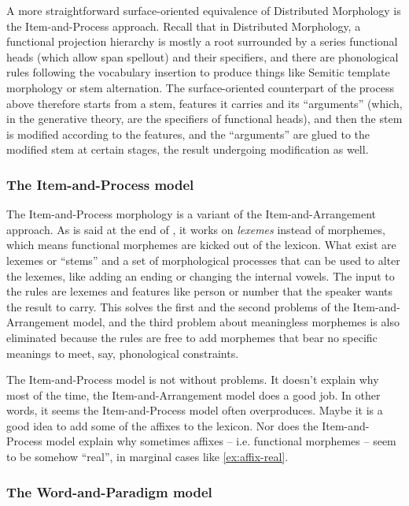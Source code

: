 \documentclass[UTF8, a4paper, oneside, scheme=plain]{ctexart}
\begin{document}
A more straightforward surface-oriented equivalence of Distributed Morphology
is the Item-and-Process approach.
Recall that in Distributed Morphology, a functional projection hierarchy
is mostly a root surrounded by a series functional heads (which allow span spellout) and their specifiers,
and there are phonological rules following the vocabulary insertion 
to produce things like Semitic template morphology \citet{tucker2011morphosyntax}
or stem alternation.
The surface-oriented counterpart of the process above 
therefore starts from a stem, features it carries and its ``arguments''
(which, in the generative theory, are the specifiers of functional heads),
and then the stem is modified according to the features,
and the ``arguments'' are glued to the modified stem at certain stages,
the result undergoing modification as well.

\subsubsection{The Item-and-Process model}

The Item-and-Process morphology is a variant of the Item-and-Arrangement approach.
As is said at the end of ,
it works on \emph{lexemes} instead of morphemes,
which means functional morphemes are kicked out of the lexicon.
What exist are lexemes or ``stems'' and a set of morphological processes 
that can be used to alter the lexemes,
like adding an ending or changing the internal vowels.
The input to the rules are lexemes and 
features like person or number that the speaker wants the result to carry.
This solves the first and the second problems of the Item-and-Arrangement model,
and the third problem about meaningless morphemes 
is also eliminated because 
the rules are free to add morphemes that bear no specific meanings 
to meet, say, phonological constraints.

The Item-and-Process model is not without problems.
It doesn't explain why most of the time,
the Item-and-Arrangement model does a good job.
In other words,
it seems the Item-and-Process model often overproduces.
Maybe it is a good idea to add some of the affixes to the lexicon.
Nor does the Item-and-Process model 
explain why sometimes affixes -- i.e. functional morphemes -- seem to be somehow ``real'',
in marginal cases like \eqref{ex:affix-real}.

\subsubsection{The Word-and-Paradigm model}\label{sec:word-and-paradigm}
\end{document}
